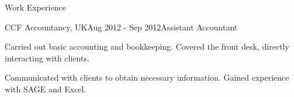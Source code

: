 \documentclass{resume} %
\begin{document}
\begin{rSection}{Work Experience}
\begin{rSubsection}{CCF Accountancy, UK}{Aug 2012 - Sep 2012}{Assistant Accountant}{}
\item Carried out basic accounting and bookkeeping. Covered the front desk, directly interacting with clients.
\item Communicated with clients to obtain necessary information. Gained experience with SAGE and Excel. 
\end{rSubsection}

\fi



\end{rSection}

\end{document}
